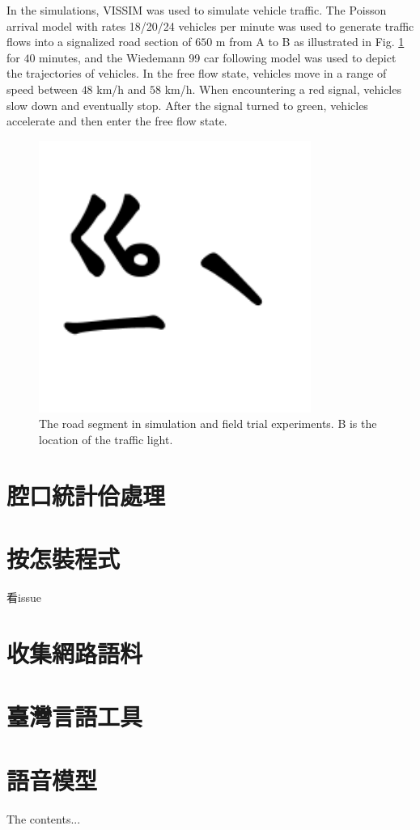 \documentclass[final,oneside,onecolumn,12pt,a4paper]{book}%
\begin{document}
In the simulations, VISSIM \cite{Mosseri2004VISSIM} was used to simulate
vehicle traffic. The Poisson arrival model with rates 18/20/24 vehicles per
minute was used to generate traffic flows into a signalized road section of
$650$ m from A to B as illustrated in Fig. \ref{fig:f_map} for $40$ minutes,
and the Wiedemann 99 car following model \cite{Mosseri2004VISSIM} was used to
depict the trajectories of vehicles. In the free flow state, vehicles move in
a range of speed between $48$ km/h and $58$ km/h. When encountering a red
signal, vehicles slow down and eventually stop. After the signal turned to
green, vehicles accelerate and then enter the free flow state.
\begin{figure}[pth]
\centerline{\includegraphics[angle=0, width=3.5in,keepaspectratio]
{圖/⿳⿳ㆣㄧˋ}} \hfill\caption{The road segment in simulation and field
trial experiments. B is the location of the traffic light.}%
\label{fig:f_map}%
\end{figure}




\begin{appendices}
\chapter{腔口統計佮處理}
\label{章：腔口統計佮處理}
\chapter{按怎裝程式}
\label{章：按怎裝程式}
看issue
\chapter{收集網路語料}
\label{章：收集網路語料}
\chapter{臺灣言語工具}
\label{章：臺灣言語工具}
\chapter{語音模型}
\label{章：語音模型}
The contents...
\end{appendices}
\end{document}
